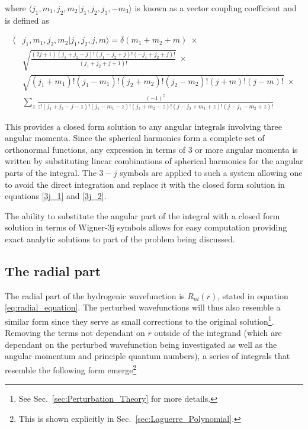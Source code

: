         \noindent where $\langle j_1, m_1, j_2, m_2 \vert j_1, j_2, j_3, - m_3 \rangle$ is known as a vector coupling coefficient and is defined as \cite{edmonds_book}

        \small
        \begin{align}
            \langle &j_1, m_1, j_2, m_2 \vert j_1, j_2, j, m \rangle = \delta(m_1 + m_2 + m) \;\times \label{3j_2}\\
            &\sqrt{\frac{(2j+1)(j_1 + j_2 - j)!(j_1 - j_2 + j)!(-j_1 + j_2 + j)!}{(j_1 + j_2 + j + 1)!}}\;\times \nonumber\\
            &\sqrt{(j_1 + m_1)!(j_1 - m_1)!(j_2 + m_2)!(j_2 - m_2)!(j+m)!(j-m)!} \; \times \nonumber\\
            & \sum_z \frac{(-1)^z}{z!(j_1 + j_2 - j - z)!(j_1 - m_1 - z)!(j_2 + m_2 - z)!(j-j_2+m_1+z)!(j-j_1-m_2 + z)!} \nonumber
        \end{align}

        \normalsize
        This provides a closed form solution to any angular integrals involving three angular momenta. Since the spherical harmonics form a complete set of orthonormal functions, any expression in terms of 3 or more angular momenta is written by substituting linear combinations of spherical harmonics for the angular parts of the integral. The $3-j$ symbols are applied to such a system allowing one to avoid the direct integration and replace it with the closed form solution in equations \eqref{3j_1} and \eqref{3j_2}. 
    
        The ability to substitute the angular part of the integral with a closed form solution in terms of Wigner-3j symbols allows for easy computation providing exact analytic solutions to part of the problem being discussed.

        \subsection{The radial part} \label{sec:The_Radial_Part}
            The radial part of the hydrogenic wavefunction is $R_{nl}(r)$, stated in equation \eqref{eq:radial_equation}. The perturbed wavefunctions will thus also resemble a similar form since they serve as small corrections to the original solution\footnote{See Sec.~\ref{sec:Perturbation_Theory} for more details.}. Removing the terms not dependant on $r$ outside of the integrand (which are dependant on the perturbed wavefunction being investigated as well as the angular momentum and principle quantum numbers), a series of integrals that resemble the following form emerge\footnote{This is shown explicitly in Sec.~\ref{sec:Laguerre_Polynomial}.}

